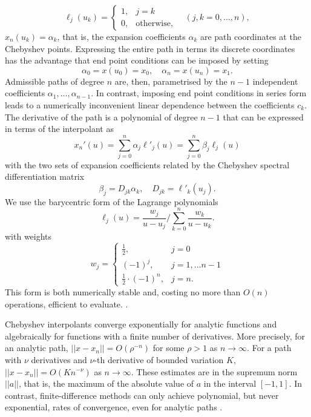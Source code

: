 \[
\ell_{j}(u_{k})=\begin{cases}
1, & j=k\\
0, & \text{otherwise,}
\end{cases}\quad(j,k=0,\ldots,n),
\]
 $x_{n}(u_{k})=\alpha_{k}$, that is, the expansion coefficients $\alpha_{k}$
are path coordinates at the Chebyshev points. Expressing the entire
path in terms its discrete coordinates has the advantage that end
point conditions can be imposed by setting
\begin{equation}
\alpha_{0}=x(u_{0})=x_{0},\quad\alpha_{n}=x(u_{n})=x_{1}.
\end{equation}
Admissible paths of degree $n$ are, then, parametrised by the $n-1$
independent coefficients $\alpha_{1},\ldots,\alpha_{n-1}$. In contrast,
imposing end point conditions in series form leads to a numerically
inconvenient linear dependence between the coefficients $c_{k}$.
The derivative of the path is a polynomial of degree $n-1$ that can
be expressed in terms of the interpolant as
\begin{equation}
x_{n}'(u)=\sum_{j=0}^{n}\alpha_{j}\ell'_{j}(u)=\sum_{j=0}^{n}\beta_{j}\ell_{j}(u)
\end{equation}
with the two sets of expansion coefficients related by the Chebyshev
spectral differentiation matrix
\begin{equation}
\beta_{j}=D_{jk}\alpha_{k},\quad D_{jk}=\ell'_{k}(u_{j}).
\end{equation}
We use the barycentric form of the Lagrange polynomials \citep{hamming2012numerical}
\begin{equation}
\ell_{j}(u)=\frac{w_{j}}{u-u_{j}}\bigg/\sum_{k=0}^{n}\frac{w_{k}}{u-u_{k}}.
\end{equation}
with weights \citep{salzer1972lagrangian}
\[
w_{j}=\begin{cases}
\frac{1}{2}, & j=0\\
(-1)^{j}, & j=1,\ldots n-1\\
\frac{1}{2}\cdot(-1)^{n}, & j=n.
\end{cases}
\]
This form is both numerically stable and, costing no more than $O(n)$
operations, efficient to evaluate. \citep{berrutBarycentricLagrangeInterpolation2004}. 

Chebyshev interpolants converge exponentially for analytic functions
and algebraically for functions with a finite number of derivatives.
More precisely, for an analytic path, $||x-x_{n}||=O(\rho^{-n})$
for some $\rho>1$ as $n\rightarrow\infty$. For a path with $\nu$
derivatives and $\nu$-th derivative of bounded variation $K$, $||x-x_{n}||=O(Kn^{-\nu})$
as $n\rightarrow\infty$. These estimates are in the supremum norm
$||a||$, that is, the maximum of the absolute value of $a$ in the
interval $[-1,1].$ In contrast, finite-difference methods can only
achieve polynomial, but never exponential, rates of convergence, even
for analytic paths \citep{trefethen2000spectral,boyd2001chebyshev}.

